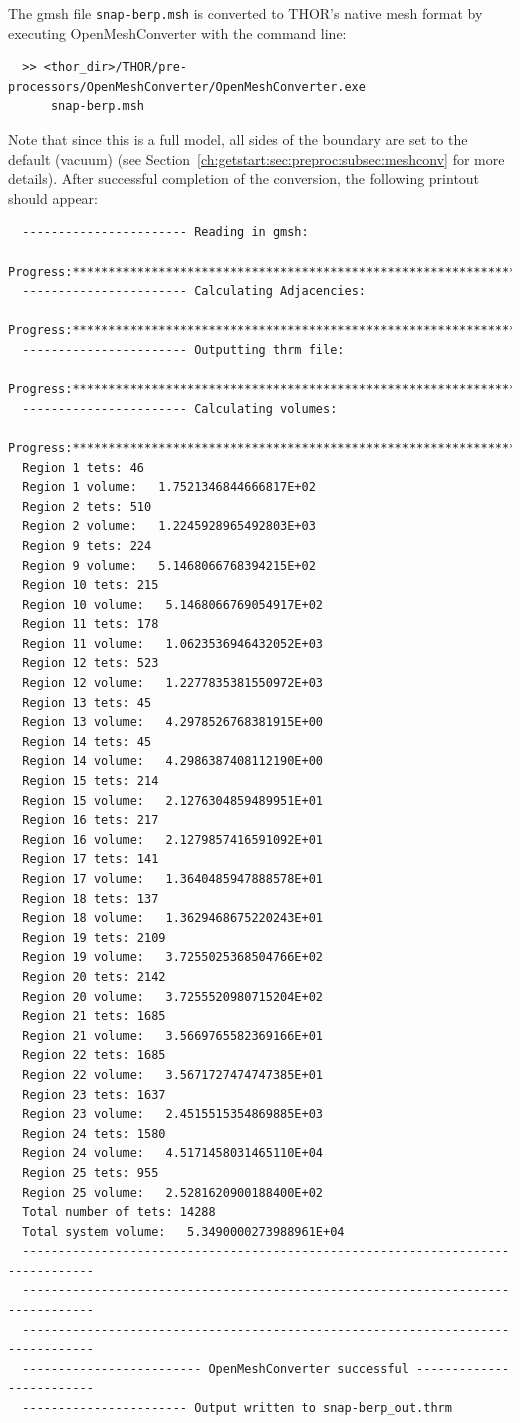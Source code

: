 The gmsh file \verb"snap-berp.msh" is converted to \ac{THOR}'s native mesh format by executing OpenMeshConverter with the command line:
\begin{verbatim}
  >> <thor_dir>/THOR/pre-processors/OpenMeshConverter/OpenMeshConverter.exe
      snap-berp.msh
\end{verbatim}
Note that since this is a full model, all sides of the boundary are set to the default (vacuum) (see Section~\ref{ch:getstart:sec:preproc:subsec:meshconv} for more details).
After successful completion of the conversion, the following printout should appear:
\begin{verbatim}
  ----------------------- Reading in gmsh:
  Progress:***********************************************************************
  ----------------------- Calculating Adjacencies:
  Progress:***********************************************************************
  ----------------------- Outputting thrm file:
  Progress:***********************************************************************
  ----------------------- Calculating volumes:
  Progress:***********************************************************************
  Region 1 tets: 46
  Region 1 volume:   1.7521346844666817E+02
  Region 2 tets: 510
  Region 2 volume:   1.2245928965492803E+03
  Region 9 tets: 224
  Region 9 volume:   5.1468066768394215E+02
  Region 10 tets: 215
  Region 10 volume:   5.1468066769054917E+02
  Region 11 tets: 178
  Region 11 volume:   1.0623536946432052E+03
  Region 12 tets: 523
  Region 12 volume:   1.2277835381550972E+03
  Region 13 tets: 45
  Region 13 volume:   4.2978526768381915E+00
  Region 14 tets: 45
  Region 14 volume:   4.2986387408112190E+00
  Region 15 tets: 214
  Region 15 volume:   2.1276304859489951E+01
  Region 16 tets: 217
  Region 16 volume:   2.1279857416591092E+01
  Region 17 tets: 141
  Region 17 volume:   1.3640485947888578E+01
  Region 18 tets: 137
  Region 18 volume:   1.3629468675220243E+01
  Region 19 tets: 2109
  Region 19 volume:   3.7255025368504766E+02
  Region 20 tets: 2142
  Region 20 volume:   3.7255520980715204E+02
  Region 21 tets: 1685
  Region 21 volume:   3.5669765582369166E+01
  Region 22 tets: 1685
  Region 22 volume:   3.5671727474747385E+01
  Region 23 tets: 1637
  Region 23 volume:   2.4515515354869885E+03
  Region 24 tets: 1580
  Region 24 volume:   4.5171458031465110E+04
  Region 25 tets: 955
  Region 25 volume:   2.5281620900188400E+02
  Total number of tets: 14288
  Total system volume:   5.3490000273988961E+04
  --------------------------------------------------------------------------------
  --------------------------------------------------------------------------------
  --------------------------------------------------------------------------------
  ------------------------- OpenMeshConverter successful -------------------------
  ----------------------- Output written to snap-berp_out.thrm
\end{verbatim}

